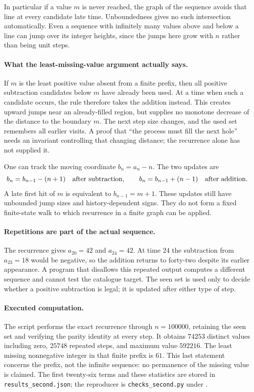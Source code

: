 \documentclass[11pt,a4paper]{article}
\begin{document}
In particular if a value $m$ is never reached, the graph of the sequence
avoids that line at every candidate late time. Unboundedness gives no
such intersection automatically. Even a sequence with infinitely many
values above and below a line can jump over its integer heights, since
the jumps here grow with $n$ rather than being unit steps.

\paragraph{What the least-missing-value argument actually says.}
If $m$ is the least positive value absent from a finite prefix, then
all positive subtraction candidates below $m$ have already been used.
At a time when such a candidate occurs, the rule therefore takes the
addition instead. This creates upward jumps near an already-filled
region, but supplies no monotone decrease of the distance to the
boundary $m$. The next step size changes, and the used set remembers
all earlier visits. A proof that ``the process must fill the next hole''
needs an invariant controlling that changing distance; the recurrence
alone has not supplied it.

One can track the moving coordinate $b_n=a_n-n$. The two updates are
\[
 b_n=b_{n-1}-(n+1)\quad\hbox{after subtraction},\qquad
 b_n=b_{n-1}+(n-1)\quad\hbox{after addition}.
\]
A late first hit of $m$ is equivalent to $b_{n-1}=m+1$. These
updates still have unbounded jump sizes and history-dependent signs.
They do not form a fixed finite-state walk to which recurrence in a
finite graph can be applied.

\paragraph{Repetitions are part of the actual sequence.}
The recurrence gives $a_{20}=42$ and $a_{24}=42$. At time $24$ the
subtraction from $a_{23}=18$ would be negative, so the addition returns
to forty-two despite its earlier appearance. A program that disallows
this repeated output computes a different sequence and cannot test the
catalogue target. The seen set is used only to decide whether a positive
subtraction is legal; it is updated after either type of step.

\paragraph{Executed computation.}
The script performs the exact recurrence through $n=100000$, retaining
the seen set and verifying the parity identity at every step. It
obtains $74253$ distinct values including zero, $25748$ repeated steps,
and maximum value $592216$. The least missing nonnegative integer in
that finite prefix is $61$. This last statement concerns the prefix,
not the infinite sequence: no permanence of the missing value is
claimed. The first twenty-six terms and these statistics are stored
in \texttt{results\_second.json}; the reproducer is
\texttt{checks\_second.py} under
.
\end{document}
